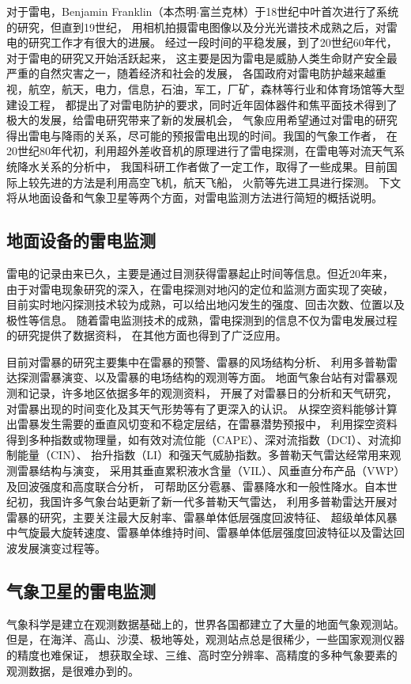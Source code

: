 对于雷电，Benjamin Franklin（本杰明$\cdot$富兰克林）于18世纪中叶首次进行了系统的研究，但直到19世纪，
用相机拍摄雷电图像以及分光光谱技术成熟之后，对雷电的研究工作才有很大的进展。
经过一段时间的平稳发展，到了20世纪60年代，对于雷电的研究又开始活跃起来，
这主要是因为雷电是威胁人类生命财产安全最严重的自然灾害之一，随着经济和社会的发展，
各国政府对雷电防护越来越重视，航空，航天，电力，信息，石油，军工，厂矿，森林等行业和体育场馆等大型建设工程，
都提出了对雷电防护的要求，同时近年固体器件和焦平面技术得到了极大的发展，给雷电研究带来了新的发展机会，
气象应用希望通过对雷电的研究得出雷电与降雨的关系，尽可能的预报雷电出现的时间。我国的气象工作者，
在20世纪80年代初，利用超外差收音机的原理进行了雷电探测，在雷电等对流天气系统降水关系的分析中，
我国科研工作者做了一定工作，取得了一些成果。目前国际上较先进的方法是利用高空飞机，航天飞船，
火箭等先进工具进行探测。
下文将从地面设备和气象卫星等两个方面，对雷电监测方法进行简短的概括说明。


\subsection{地面设备的雷电监测}
雷电的记录由来已久，主要是通过目测获得雷暴起止时间等信息。但近20年来，
由于对雷电现象研究的深入，在雷电探测对地闪的定位和监测方面实现了突破，
目前实时地闪探测技术较为成熟，可以给出地闪发生的强度、回击次数、位置以及极性等信息。
随着雷电监测技术的成熟，雷电探测到的信息不仅为雷电发展过程的研究提供了数据资料，
在其他方面也得到了广泛应用。

目前对雷暴的研究主要集中在雷暴的预警、雷暴的风场结构分析、
利用多普勒雷达探测雷暴演变、以及雷暴的电场结构的观测等方面。
地面气象台站有对雷暴观测和记录，许多地区依据多年的观测资料，
开展了对雷暴日的分析和天气研究，对雷暴出现的时间变化及其天气形势等有了更深入的认识。
从探空资料能够计算出雷暴发生需要的垂直风切变和不稳定层结，在雷暴潜势预报中，
利用探空资料得到多种指数或物理量，如有效对流位能（CAPE）、深对流指数（DCI）、对流抑制能量（CIN）、
抬升指数（LI）和强天气威胁指数。多普勒天气雷达经常用来观测雷暴结构与演变，
采用其垂直累积液水含量（VIL）、风垂直分布产品（VWP）及回波强度和高度联合分析，
可帮助区分雹暴、雷暴降水和一般性降水。自本世纪初，我国许多气象台站更新了新一代多普勒天气雷达，
利用多普勒雷达开展对雷暴的研究，主要关注最大反射率、雷暴单体低层强度回波特征、
超级单体风暴中气旋最大旋转速度、雷暴单体维持时间、雷暴单体低层强度回波特征以及雷达回波发展演变过程等\cite{leida}。


\subsection{气象卫星的雷电监测}
气象科学是建立在观测数据基础上的，世界各国都建立了大量的地面气象观测站。
但是，在海洋、高山、沙漠、极地等处，观测站点总是很稀少，一些国家观测仪器的精度也难保证，
想获取全球、三维、高时空分辨率、高精度的多种气象要素的观测数据，是很难办到的。

